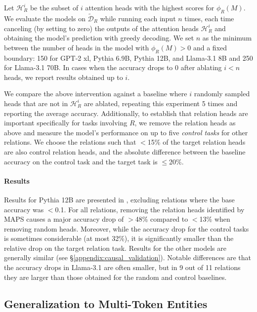 \documentclass[11pt]{article}
\newcommand{\llamaThreeSeventyB}{Llama-3.1 70B}
\newcommand{\llamaThreeEightB}{Llama-3.1 8B}
\newcommand{\llama}{Llama-3.1}
\newcommand{\PythiaTwelveB}{Pythia 12B}
\newcommand{\PythiaSevenB}{Pythia 6.9B}
\newcommand{\GPTxl}{GPT-2 xl}
\newcommand{\framework}{\textsc{MAPS}}
\begin{document}
Let $\mathcal{H}_R^i$ be the subset of $i$ attention heads with the highest scores for $\phi_R(M)$. We evaluate the models on $\tilde{\mathcal{D}}_R$ while running each input $n$ times,
each time canceling (by setting to zero) the outputs of the attention heads $\mathcal{H}_R^i$ and obtaining the model's prediction with greedy decoding. We set $n$ as the minimum between the number of heads in the model with $\phi_R(M)>0$
and a fixed boundary: 150 for \GPTxl{}, \PythiaSevenB{}, \PythiaTwelveB{}, and \llamaThreeEightB{} and 250 for \llamaThreeSeventyB{}. In cases when the accuracy drops to 0 after ablating $i < n$ heads, we report results obtained up to $i$.

 
We compare the above intervention against a baseline where $i$ randomly sampled heads that are not in $\mathcal{H}_R^i$ are ablated, repeating this experiment 5 times and reporting the average accuracy. Additionally, to establish that relation heads are important specifically for tasks involving $R$, we remove the relation heads as above and measure the model's performance on up to five \textit{control tasks} for other relations. We choose the relations such that $<$15\% of the target relation heads are also control relation heads, and the absolute difference between the baseline accuracy on the control task and the target task is $\leq$20\%. 


\paragraph{Results}
Results for \PythiaTwelveB{} are presented in , excluding relations where the base accuracy was $<$0.1. For all relations, removing the relation heads identified by \framework{} causes a major accuracy drop of $>$48\% compared to $<$13\% when removing random heads. Moreover, while the accuracy drop for the control tasks is sometimes considerable (at most 32\%), it is significantly smaller than the relative drop on the target relation task.
Results for the other models are generally similar (see  \S\ref{appendix:causal_validation}). Notable differences are that the accuracy drops in \llama{} are often smaller, but in 9 out of 11 relations they are larger than those obtained for the random and control baselines. 

\subsection{Generalization to Multi-Token Entities}
\label{subsec:multi_token}
\end{document}
